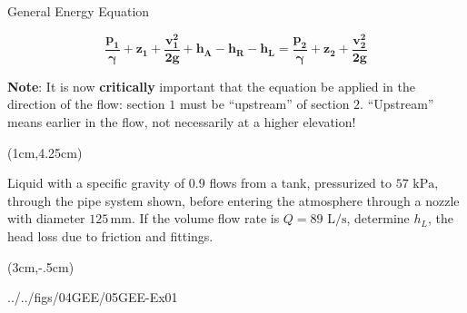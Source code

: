 \documentclass[9pt,xcolor={svgnames, x11names},professionalfonts, mathserif]{beamer}
\begin{document}
\begin{frame}{General Energy Equation}
	\begin{center}
		\begin{minipage}{0.75\textwidth}
			\raggedright
			\begin{mybox}[width=8cm, title=General Energy Equation (GEE)]
				\[\bm{  \frac{p_1}{\gamma}+z_1+\frac{v_1^2}{2g}+h_A-h_R-h_L=\frac{p_2}{\gamma}+z_2+\frac{v_2^2}{2g}} \]
			\end{mybox}
			\vspace{1cm}\pause
			\textbf{Note}: It is now \textbf{critically} important that the equation be applied in the direction of the flow:
			section $1$ must be ``upstream'' of section $2$.\parb
			``Upstream'' means earlier in the flow, not necessarily at a higher elevation!
			
		\end{minipage}
	\end{center}
\end{frame}

\begin{frame}
	\begin{textblock*}{6.55cm}(1cm,4.25cm)
		\begin{myexam}[colframe=example, colbacktitle=example!80!white]{}{}
			\raggedright
			Liquid with a specific gravity of $0.9$ flows from a tank, pressurized to $57\text{ kPa}$, through the pipe system shown, before entering the atmosphere through a nozzle with diameter $125\,\text{mm}$. \parm
			If the volume flow rate is $Q=89\text{ L/s}$, determine $h_L$, the head loss due to friction and fittings.
		\end{myexam}
	\end{textblock*}
	\begin{textblock*}{5cm}(3cm,-.5cm)
		\begin{cfig}[0.35]{../../figs/04GEE/05GEE-Ex01}\end{cfig}
	\end{textblock*}
	
\end{frame}

\end{document}
